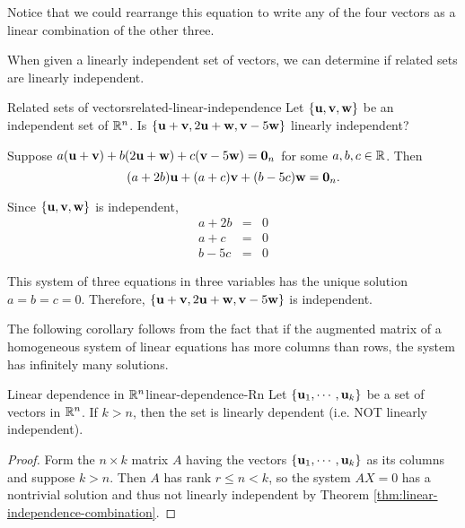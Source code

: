 \begin{solution}
Notice that we could rearrange this equation to write any of the four vectors as a linear combination of the other three. 
\end{solution}

When given a linearly independent set of vectors, we can determine if related sets are linearly independent. 

\begin{example}{Related sets of vectors}{related-linear-independence}
Let $\{\mbox{\bf u},\mbox{\bf v},\mbox{\bf w}\}$ be an independent set of $\mathbb{R}^n$.
Is $\{\mbox{\bf u}+\mbox{\bf v}, 2\mbox{\bf u}+\mbox{\bf w}, \mbox{\bf v}-5\mbox{\bf w}\}$ linearly
independent?
\end{example}

\begin{solution}
Suppose $a(\mbox{\bf u}+\mbox{\bf v}) + b(2\mbox{\bf u}+\mbox{\bf w}) + c(\mbox{\bf v}-5\mbox{\bf w})=\mbox{\bf 0}_n$
for some $a,b,c\in\mathbb{R}$.
Then 
\[ (a+2b)\mbox{\bf u} + (a+c)\mbox{\bf v} + (b-5c)\mbox{\bf w}=\mbox{\bf 0}_n.\]

Since $\{\mbox{\bf u},\mbox{\bf v},\mbox{\bf w}\}$ is independent, 
\begin{eqnarray*}
a + 2b & = & 0 \\
a + c & = & 0 \\
b - 5c & = & 0 
\end{eqnarray*}

This system of three equations in three variables has 
the unique solution $a=b=c=0$.
Therefore, $\{\mbox{\bf u}+\mbox{\bf v}, 2\mbox{\bf u}+\mbox{\bf w}, \mbox{\bf v}-5\mbox{\bf w}\}$ is independent.
\end{solution}

The following corollary follows from the fact that if the augmented matrix of a homogeneous
system of linear equations has more columns than rows, the system has infinitely many
solutions.

\begin{corollary}{Linear dependence in $\mathbb{R}^{n}$}{linear-dependence-Rn}
Let $\left\{\mbox{\bf u}_{1},\cdots ,\mbox{\bf u}_{k}\right\} $
be a set of vectors in $\mathbb{R}^{n}$. 
If $k>n$, then the set is linearly dependent (i.e. NOT linearly independent).
\end{corollary}

\begin{proof}
Form the $n \times k$ matrix $A$ having the vectors $\left\{
\mbox{\bf u}_{1},\cdots ,\mbox{\bf u}_{k}\right\} $ as its columns and suppose $k > n$. Then $A$ has rank $r \leq n <k$, so 
the system $AX=0$ has a nontrivial solution %
 and thus not linearly independent by Theorem 
 \ref{thm:linear-independence-combination}.
\end{proof}

